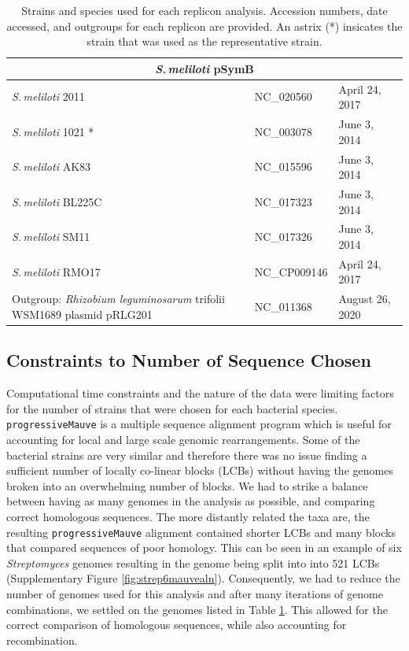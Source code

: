 \documentclass[11pt]{article}
\newcommand{\smel}{\textit{S.\,meliloti}\xspace}
\newcommand{\agrot}{\textit{Agrobacterium tumefaciens}\xspace}
\newcommand{\strep}{\textit{Streptomyces}\xspace}
\newcommand{\p}{\texttt{progressiveMauve}\xspace}
\newcommand{\rleg}{\textit{Rhizobium leguminosarum}\xspace}
\begin{document}
\begin{table}[H]
{\begin{minipage}{\textwidth}
\begin{tabular}{lll}
				\midrule
				\multicolumn{3}{c}{\smel pSymB} \\
				\midrule
				\smel 2011 & NC\_020560 & April 24, 2017\\
				\smel 1021 * & NC\_003078 & June 3, 2014\\
				\smel AK83 & NC\_015596 & June 3, 2014\\
				\smel BL225C & NC\_017323 & June 3, 2014\\
				\smel SM11 & NC\_017326 & June 3, 2014\\
				\smel RMO17 & NC\_CP009146 & April 24, 2017\\
				Outgroup: \rleg trifolii WSM1689 plasmid pRLG201 & NC\_011368 & August 26, 2020\\
		
				\bottomrule
				
				
			\end{tabular}
			\caption{\label{tab:seqdata} Strains and species used for each replicon analysis. Accession numbers, date accessed, and outgroups for each replicon are provided. An astrix (*) insicates the strain that was used as the representative strain.}
		\end{minipage}}
	\end{table}	

\subsection{Constraints to Number of Sequence Chosen}
Computational time constraints and the nature of the data were limiting factors for the number of strains that were chosen for each bacterial species.
\p is a multiple sequence alignment program which is useful for accounting for local and large scale genomic rearrangements. 
Some of the bacterial strains are very similar and therefore there was no issue finding a sufficient number of locally co-linear blocks (LCBs) without having the genomes broken into an overwhelming number of blocks.
We had to strike a balance between having as many genomes in the analysis as possible, and comparing correct homologous sequences.
The more distantly related the taxa are, the resulting \p alignment contained shorter LCBs and many blocks that compared sequences of poor homology.
This can be seen in an example of six \strep genomes resulting in the genome being split into into 521 LCBs (Supplementary Figure \ref{fig:strep6mauvealn}).
Consequently, we had to reduce the number of genomes used for this analysis and after many iterations of genome combinations, we settled on the genomes listed in Table \ref{tab:seqdata}.
This allowed for the correct comparison of homologous sequences, while also accounting for recombination.
\end{document}
